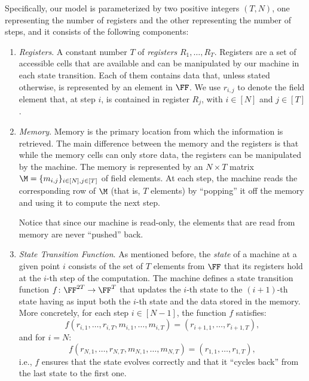 Specifically, our model is parameterized by two positive integers $(T, N)$, one representing the number of registers and the other representing the number of steps, and it consists of the following components:
\begin{enumerate}
    \item \textit{Registers}. A constant number $T$ of \textit{registers} $R_1,\dots,R_T$. Registers are a set of accessible cells that are available and can be manipulated by our machine in each state transition. Each of them contains data that, unless stated otherwise, is represented by an element in $\FF$. We use $r_{i,j}$ to denote the field element that, at step $i$, is contained in register $R_j$, with $i\in[N]$ and $j \in [T]$. 
        
    
    \item \textit{Memory}. Memory is the primary location from which the information is retrieved. The main difference between the memory and the registers is that while the memory cells can only store data, the registers can be manipulated by the machine. The memory is represented by an $N \times T$ matrix $\M = \{m_{i,j}\}_{i\in[N],j\in[T]}$ of field elements. At each step, the machine reads the corresponding row of $\M$ (that is, $T$ elements) by ``popping'' it off the memory and using it to compute the next step. 
    \begin{remark}
        Notice that since our machine is read-only, the elements that are read from memory are never ``pushed'' back.
    \end{remark}
    
    
    \item \textit{State Transition Function}. As mentioned before, the \textit{state} of a machine at a given point $i$ consists of the set of $T$ elements from $\FF$ that its registers hold at the $i$-th step of the computation. The machine defines a state transition function $f \colon \FF^{2T} \to \FF^T$ that updates the $i$-th state to the $(i+1)$-th state having as input both the $i$-th state and the data stored in the memory. More concretely, for each step $i \in [N-1]$, the function $f$ satisfies:
    \[
    f(r_{i,1},\dots,r_{i,T},m_{i,1},\dots,m_{i,T}) = (r_{i+1,1},\dots,r_{i+1,T}),
    \]
    and for $i = N$:
    \[
    f(r_{N,1},\dots,r_{N,T},m_{N,1},\dots,m_{N,T}) = (r_{1,1},\dots,r_{1,T}),
    \]
    i.e., $f$ ensures that the state evolves correctly and that it ``cycles back'' from the last state to the first one.
    

\end{enumerate}
